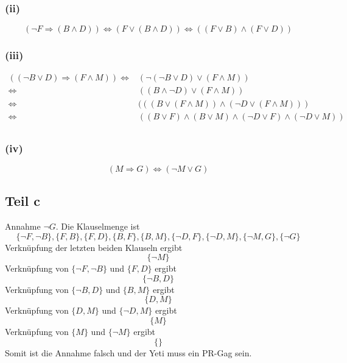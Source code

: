 \documentclass[10pt,a4paper]{article}
\begin{document}
\subsubsection{(ii)}

\begin{equation}
  (\lnot F \Rightarrow (B \land D)) \Leftrightarrow (F \lor (B \land D)) \Leftrightarrow ((F \lor B) \land (F \lor D))
\end{equation}

\subsubsection{(iii)}

\begin{align*}
  ((\lnot B \lor D) \Rightarrow (F \land M)) \Leftrightarrow & (\lnot(\lnot B \lor D) \lor (F \land M))\\
  \Leftrightarrow & ((B \land \lnot D) \lor (F \land M))\\
  \Leftrightarrow & (((B \lor (F \land M)) \land (\lnot D \lor (F \land M)))\\
  \Leftrightarrow & ((B \lor F) \land (B \lor M) \land (\lnot D \lor F) \land (\lnot D \lor M))\\
\end{align*}

\subsubsection{(iv)}

\begin{equation}
  (M \Rightarrow G) \Leftrightarrow (\lnot M \lor G)
\end{equation}

\subsection{Teil c}

Annahme $\lnot G$.
Die Klauselmenge ist
\begin{equation}
  \{ \lnot F, \lnot B \}, \{ F, B \}, \{ F, D \}, \{ B, F \}, \{ B, M \}, \{ \lnot D, F \}, \{ \lnot D, M \}, \{ \lnot M, G \}, \{ \lnot G \}
\end{equation}
Verknüpfung der letzten beiden Klauseln ergibt
\begin{equation}
  \{ \lnot M \}
\end{equation}
Verknüpfung von $\{ \lnot F, \lnot B \}$ und $\{ F, D \}$ ergibt
\begin{equation}
  \{ \lnot B, D \}
\end{equation}
Verknüpfung von $\{ \lnot B, D \}$ und $\{ B, M \}$ ergibt
\begin{equation}
  \{ D, M \}
\end{equation}
Verknüpfung von $\{ D, M \}$ und $\{ \lnot D, M \}$ ergibt
\begin{equation}
  \{ M \}
\end{equation}
Verknüpfung von $\{ M \}$ und $\{ \lnot M \}$ ergibt
\begin{equation}
  \{ \}
\end{equation}
Somit ist die Annahme falsch und der Yeti muss ein PR-Gag sein.
\end{document}
